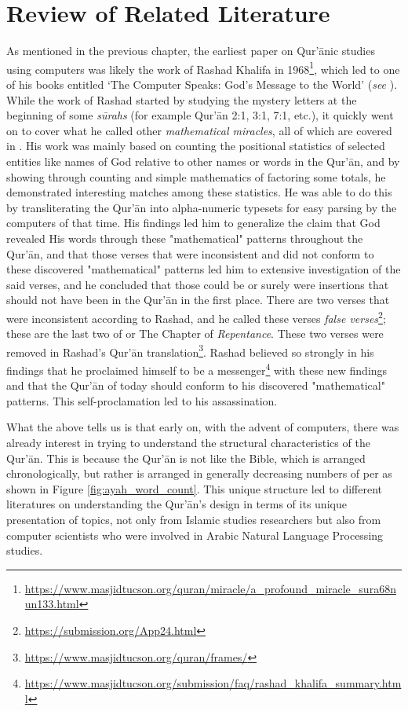 \chapter{Review of Related Literature}\label{ch:rrl}

As mentioned in the previous chapter, the earliest paper on Qur'\=anic studies using computers was likely the work of Rashad Khalifa in 1968\footnote{\url{https://www.masjidtucson.org/quran/miracle/a_profound_miracle_sura68nun133.html}}, which led to one of his books entitled `The Computer Speaks: God's Message to the World' (\textit{see} ). While the work of Rashad started by studying the mystery letters at the beginning of some \textit{s\=urahs}  (for example Qur'\=an 2:1, 3:1, 7:1, etc.), it quickly went on to cover what he called other \textit{mathematical miracles}, all of which are covered in . His work was mainly based on counting the positional statistics of selected entities like names of God relative to other names or words in the Qur'\=an, and by showing through counting and simple mathematics of factoring some totals, he demonstrated interesting matches among these statistics. He was able to do this by transliterating the Qur'\=an into alpha-numeric typesets for easy parsing by the computers of that time. His findings led him to generalize the claim that God revealed His words through these "mathematical" patterns throughout the Qur'\=an, and that those verses that were inconsistent and did not conform to these discovered "mathematical" patterns led him to extensive investigation of the said verses, and he concluded that those could be or surely were insertions that should not have been in the Qur'\=an in the first place. There are two verses that were inconsistent according to Rashad, and he called these verses \textit{false verses}\footnote{\url{https://submission.org/App24.html}}; these are the last two   of   or The Chapter of \textit{Repentance}. These two verses were removed in Rashad's Qur'\=an translation\footnote{\url{https://www.masjidtucson.org/quran/frames/}}. Rashad believed so strongly in his findings that he proclaimed himself to be a messenger\footnote{\url{https://www.masjidtucson.org/submission/faq/rashad_khalifa_summary.html}} with these new findings and that the Qur'\=an of today should conform to his discovered "mathematical" patterns. This self-proclamation led to his assassination.

What the above tells us is that early on, with the advent of computers, there was already interest in trying to understand the structural characteristics of the Qur'\=an. This is because the Qur'\=an is not like the Bible, which is arranged chronologically, but rather is arranged in generally decreasing numbers of   per   as shown in Figure \ref{fig:ayah_word_count}. This unique structure led to different literatures on understanding the Qur'\=an's design in terms of its unique presentation of topics, not only from Islamic studies researchers but also from computer scientists who were involved in Arabic Natural Language Processing studies. 

